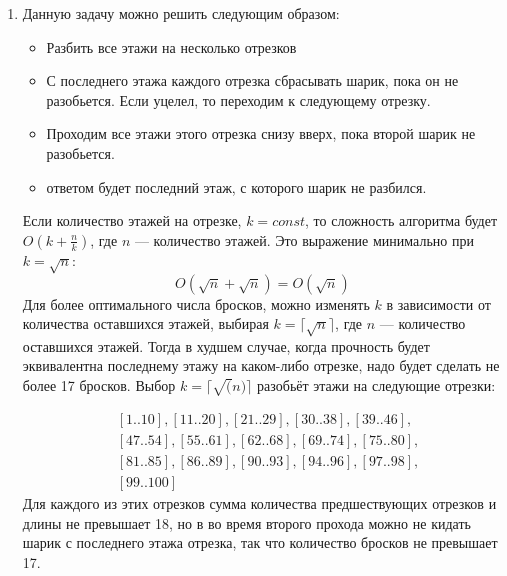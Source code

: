 \documentclass{article}
\begin{document}
\begin{enumerate}
	      Заметим, что $x = O({(\frac{y}{a_n})}^{\frac{1}{n}})$,
	      Тогда сложность алгоритма:
	      \[
		      O \left( n {(\frac{y}{a_n})}^{\frac{1}{n}} +
		      n \log \left( {(\frac{y}{a_n})}^{\frac{1}{n}} \right) \right)
	      \]

	\item Данную задачу можно решить следующим образом:
	      \begin{itemize}
		      \item Разбить все этажи на несколько отрезков
		      \item С последнего этажа каждого отрезка
		            сбрасывать шарик, пока он не разобьется.
		            Если уцелел, то переходим к следующему отрезку.
		      \item Проходим все этажи этого отрезка снизу
		            вверх, пока второй шарик не разобьется.
		      \item ответом будет последний этаж, с которого
		            шарик не разбился.
	      \end{itemize}
	      Если количество этажей на отрезке, $k = const$,
	      то сложность алгоритма будет
	      $O(k + \frac{n}{k})$, где $n$ --- количество этажей.
	      Это выражение минимально при $k = \sqrt{n}$:
	      \[
		      O(\sqrt{n} + \sqrt{n}) = O(\sqrt{n})
	      \]
	      Для более оптимального числа бросков, можно
	      изменять $k$ в зависимости от количества оставшихся
	      этажей, выбирая $k = \lceil \sqrt{n} \rceil$, где $n$ ---
	      количество оставшихся этажей.
	      Тогда в худшем случае, когда прочность будет
	      эквивалентна последнему этажу на каком-либо отрезке,
	      надо будет сделать не более 17 бросков.
	      Выбор $k = \lceil \sqrt(n) \rceil$ разобьёт
	      этажи на следующие отрезки:

	      \[
		      \begin{aligned}
			       & [1..10], [11..20], [21..29], [30..38], [39..46],  \\
			       & [47..54], [55..61], [62..68], [69..74], [75..80], \\
			       & [81..85], [86..89], [90..93], [94..96], [97..98], \\
			       & [99..100]
		      \end{aligned}
	      \]
	      Для каждого из этих отрезков сумма количества
	      предшествующих отрезков и длины не превышает 18, но
	      в во время второго прохода можно не кидать шарик
	      с последнего этажа отрезка, так что количество бросков
	      не превышает 17.

\end{enumerate}
\end{document}
